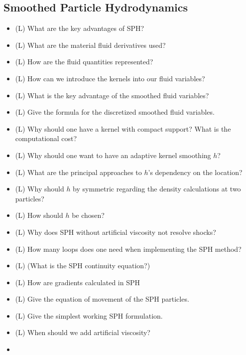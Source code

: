 \subsection*{Smoothed Particle Hydrodynamics}

\begin{itemize}
    \item (L) What are the key advantages of SPH?
    \answerboxM
    \item (L) What are the material fluid derivatives used?
    \answerboxM
    \item (L) How are the fluid quantities represented?
    \answerboxM
    \item (L) How can we introduce the kernels into our fluid variables?
    \answerboxM
    \item (L) What is the key advantage of the smoothed fluid variables?
    \answerboxS
    \item (L) Give the formula for the discretized smoothed fluid variables.
    \answerboxS
    \item (L) Why should one have a kernel with compact support? What is the computational cost?
    \answerboxS
    \item (L) Why should one want to have an adaptive kernel smoothing $h$?
    \answerboxM
    \item (L) What are the principal approaches to $h$'s dependency on the location?
    \answerboxM
    \item (L) Why should $h$ by symmetric regarding the density calculations at two particles?
    \answerboxM
    \item (L) How should $h$ be chosen?
    \answerboxM
    \item (L) Why does SPH without artificial viscosity not resolve shocks?
    \answerboxM
    \item (L) How many loops does one need when implementing the SPH method?
    \answerboxS
    \item (L) (What is the SPH continuity equation?)
    \answerboxS
    \item (L) How are gradients calculated in SPH
    \answerboxM
    \item (L) Give the equation of movement of the SPH particles.
    \answerboxM
    \item (L) Give the simplest working SPH formulation.
    \answerboxM
    \item (L) When should we add artificial viscosity?
    \item \begin{itemize}

\end{itemize}
\end{itemize}

